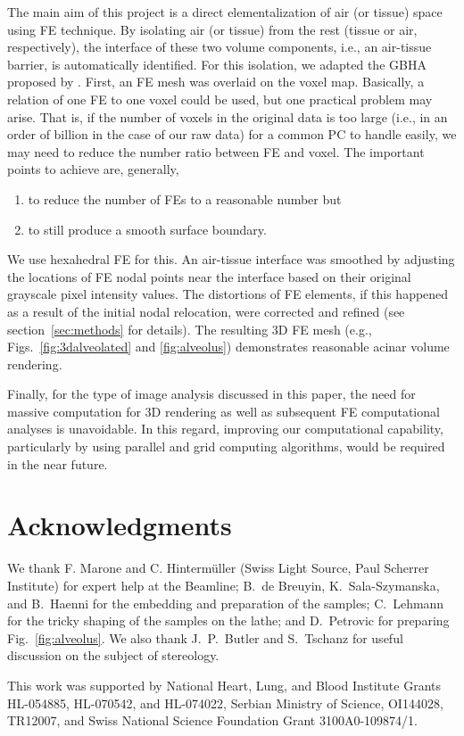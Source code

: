 The main aim of this project is a direct elementalization of air (or tissue) space using FE technique. By isolating air (or tissue) from the rest (tissue or air, respectively), the interface of these two volume components, i.e., an air-tissue barrier, is automatically identified. For this isolation, we adapted the GBHA proposed by \citet{Schneiders1996}. First, an FE mesh was overlaid on the voxel map. Basically, a relation of one FE to one voxel could be used, but one practical problem may arise. That is, if the number of voxels in the original data is too large (i.e., in an order of billion in the case of our raw data) for a common PC to handle easily, we may need to reduce the number ratio between FE and voxel. The important points to achieve are, generally, 
\begin{enumerate}
	\item to reduce the number of FEs to a reasonable number but
	\item to still produce a smooth surface boundary.
\end{enumerate}
We use hexahedral FE for this. An air-tissue interface was smoothed by adjusting the locations of FE nodal points near the interface based on their original grayscale pixel intensity values. The distortions of FE elements, if this happened as a result of the initial nodal relocation, were corrected and refined (see section~\ref{sec:methods} for details). The resulting 3D FE mesh (e.g., Figs.~\ref{fig:3dalveolated} and \ref{fig:alveolus}) demonstrates reasonable acinar volume rendering.

Finally, for the type of image analysis discussed in this paper, the need for massive computation for 3D rendering as well as subsequent FE computational analyses is unavoidable. In this regard, improving our computational capability, particularly by using parallel and grid computing algorithms, would be required in the near future.

\section{Acknowledgments}
We thank F. Marone and C. Hintermüller (Swiss Light Source, Paul Scherrer Institute) for expert help at the Beamline; B.\ de Breuyin, K.\ Sala-Szymanska, and B.\ Haenni for the embedding and preparation of the samples; C.\ Lehmann for the tricky shaping of the samples on the lathe; and D.\ Petrovic for preparing Fig.~\ref{fig:alveolus}. We also thank J.\ P.\ Butler and S.\ Tschanz for useful discussion on the subject of stereology.

This work was supported by National Heart, Lung, and Blood Institute Grants HL-054885, HL-070542, and HL-074022, Serbian Ministry of Science, OI144028, TR12007, and Swiss National Science Foundation Grant 3100A0-109874/1.